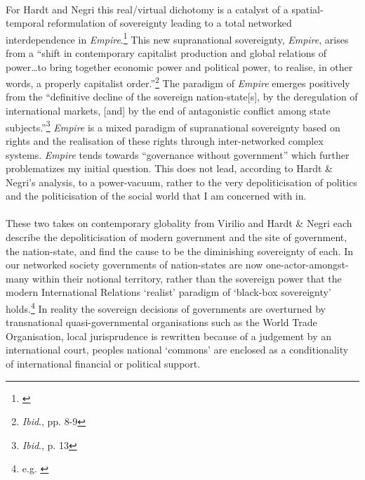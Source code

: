 \documentclass[11pt,titlepage]{book}
\begin{document}
\paragraph{}For Hardt and Negri this real/virtual dichotomy is a catalyst of a spatial-temporal reformulation of sovereignty leading to a total networked interdependence in \textit{Empire}.\footnote{\cite{Hardt:2001jl}} This new supranational sovereignty, \textit{Empire}, arises from a ``shift in contemporary capitalist production and global relations of power\ldots to bring together economic power and political power, to realise, in other words, a properly capitalist order.''\footnote{\textit{Ibid}., pp. 8-9} The paradigm of \textit{Empire} emerges positively from the ``definitive decline of the sovereign nation-state[s], by the deregulation of international markets, [and] by the end of antagonistic conflict among state subjects.''\footnote{\textit{Ibid}., p. 13} \textit{Empire} is a mixed paradigm of supranational sovereignty based on rights and the realisation of these rights through inter-networked complex systems. \textit{Empire} tends towards ``governance without government'' which further problematizes my initial question. This does not lead, according to Hardt \& Negri's analysis, to a power-vacuum, rather to the very depoliticisation of politics and the politicisation of the social world that I am concerned with in.

\paragraph{}These two takes on contemporary globality from Virilio and Hardt \& Negri each describe the depoliticisation of modern government and the site of government, the nation-state, and find the cause to be the diminishing sovereignty of each. In our networked society governments of nation-states are now one-actor-amongst-many within their notional territory, rather than the sovereign power that the modern International Relations `realist' paradigm of `black-box sovereignty' holds.\footnote{e.g. \cite{Waltz:1979}} In reality the sovereign decisions of governments are overturned by transnational quasi-governmental organisations such as the World Trade Organisation, local jurisprudence is rewritten because of a judgement by an international court, peoples national `commons' are enclosed as a conditionality of international financial or political support.
\end{document}
